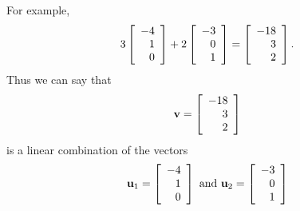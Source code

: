 For example, 
\begin{equation*}
3
\left[
\begin{array}{r}
-4 \\
1 \\
0
\end{array}
\right]
+
2
\left[
\begin{array}{r}
-3 \\
0\\
1
\end{array}
\right]
 =
\left[
\begin{array}{r}
-18 \\
3 \\
2
\end{array}
\right]. 
\end{equation*}
Thus we can say that
\begin{equation*}
\mathbf{v}= \left[
\begin{array}{r}
-18 \\
3 \\
2
\end{array}
\right]
\end{equation*}
is a linear combination of the vectors 
\begin{equation*}
\mathbf{u}_1 = \left[
\begin{array}{r}
-4 \\
1 \\
0
\end{array}
\right]
\mbox{ and } 
\mathbf{u}_2 = 
\left[
\begin{array}{r}
-3 \\
0\\
1
\end{array}
\right]
\end{equation*}
